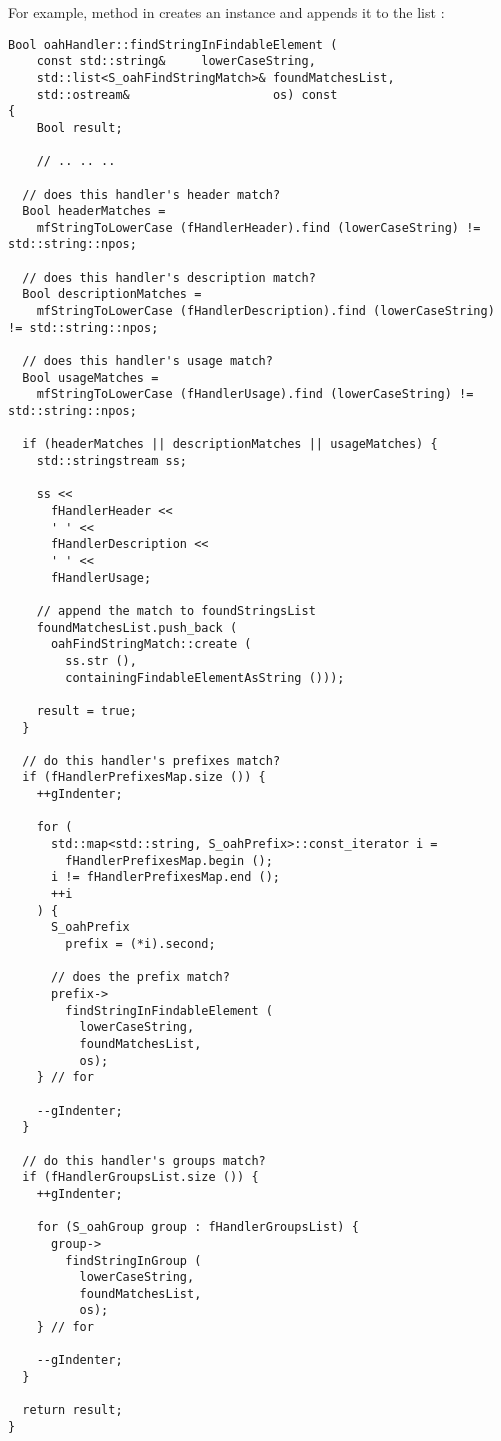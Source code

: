 For example, method  in  creates an instance and appends it to the list :
\begin{lstlisting}[language=Terminal]
Bool oahHandler::findStringInFindableElement (
	const std::string&     lowerCaseString,
	std::list<S_oahFindStringMatch>& foundMatchesList,
	std::ostream&                    os) const
{
	Bool result;

	// .. .. ..

  // does this handler's header match?
  Bool headerMatches =
    mfStringToLowerCase (fHandlerHeader).find (lowerCaseString) != std::string::npos;

  // does this handler's description match?
  Bool descriptionMatches =
    mfStringToLowerCase (fHandlerDescription).find (lowerCaseString) != std::string::npos;

  // does this handler's usage match?
  Bool usageMatches =
    mfStringToLowerCase (fHandlerUsage).find (lowerCaseString) != std::string::npos;

  if (headerMatches || descriptionMatches || usageMatches) {
    std::stringstream ss;

    ss <<
      fHandlerHeader <<
      ' ' <<
      fHandlerDescription <<
      ' ' <<
      fHandlerUsage;

    // append the match to foundStringsList
    foundMatchesList.push_back (
      oahFindStringMatch::create (
        ss.str (),
        containingFindableElementAsString ()));

    result = true;
  }

  // do this handler's prefixes match?
  if (fHandlerPrefixesMap.size ()) {
    ++gIndenter;

    for (
      std::map<std::string, S_oahPrefix>::const_iterator i =
        fHandlerPrefixesMap.begin ();
      i != fHandlerPrefixesMap.end ();
      ++i
    ) {
      S_oahPrefix
        prefix = (*i).second;

      // does the prefix match?
      prefix->
        findStringInFindableElement (
          lowerCaseString,
          foundMatchesList,
          os);
    } // for

    --gIndenter;
  }

  // do this handler's groups match?
  if (fHandlerGroupsList.size ()) {
    ++gIndenter;

    for (S_oahGroup group : fHandlerGroupsList) {
      group->
        findStringInGroup (
          lowerCaseString,
          foundMatchesList,
          os);
    } // for

    --gIndenter;
  }

  return result;
}
\end{lstlisting}

